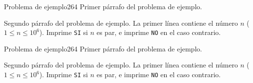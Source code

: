 
\usepackage{verbatim}



\begin{problem}{Problema de ejemplo}{2}{64}
    Primer párrafo del problema de ejemplo.

    Segundo párrafo del problema de ejemplo.
\probleminputformat
    La primer línea contiene el número $n$ ($1 \leq n \leq 10^6$).
\problemoutputformat
    Imprime \texttt{SI} si $n$ es par, e imprime \texttt{NO} en el caso contrario.
\problemexample
    
\end{problem}

\begin{problem}{Problema de ejemplo}{2}{64}
    Primer párrafo del problema de ejemplo.

    Segundo párrafo del problema de ejemplo.
\probleminputformat
    La primer línea contiene el número $n$ ($1 \leq n \leq 10^6$).
\problemoutputformat
    Imprime \texttt{SI} si $n$ es par, e imprime \texttt{NO} en el caso contrario.
\problemexample
    
\end{problem}


